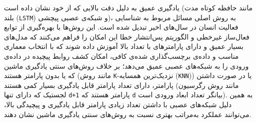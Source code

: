 یادگیری عمیق
به دلیل دقت بالایی که از خود نشان داده است\cite{chen2021deep,yang2025gaussian}
(مانند حافظه کوتاه مدت بلند (\verb;LSTM;) و شبکه‌ی عصبی پیچشی)،
به روش اصلی مسائل مربوط به شناسایی فعالیت انسان در سال‌های اخیر تبدیل شده است. این روش‌ها با بهره‌گیری از
توابع فعال‌ساز غیرخطی
و الگوریتم پس‌انتشار خطا\cite{rumelhart1986learning}
این امکان را فراهم می‌کنند که مدل‌های بسیار عمیق و دارای پارامترهای با تعداد بالا آموزش داده شوند که با انتخاب معماری مناسب و داده‌ی برچسب‌گذاری شده‌ی کافی، امکان کشف روابط پیچیده در داده‌ی ورودی را به شبکه‌های عصبی عمیق می‌دهد؛ بر خلاف روش‌های سنتی یادگیری ماشین که یا بدون پارامتر هستند (مانند روش \verb;K;-نزدیک‌ترین همسایه (\verb;KNN;))
یا در صورت داشتن پارامتر، دارای تعداد پارامتر قابل یادگیری بسیار کمی هستند
(مانند روش رگرسیون لجستیک که دارای تنها \verb|d+1| پارامتر هستند که \verb|d| بیانگر تعداد ابعاد ورودی است).
به همین دلیل شبکه‌های عصبی با داشتن تعداد زیادی پارامتر قابل یادگیری و پیچیدگی بالا، می‌توانند عملکرد به‌مراتب بهتری نسبت به روش‌های سنتی یادگیری ماشین نشان دهند.

